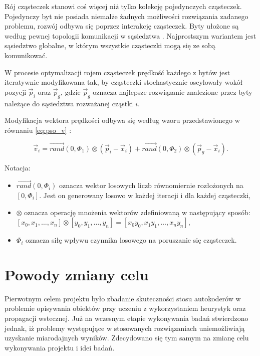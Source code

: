 \documentclass[11pt,a4paper,oneside]{report}
\begin{document}
Rój cząsteczek stanowi coś więcej niż tylko kolekcję pojedynczych cząsteczek. Pojedynczy byt nie posiada niemalże żadnych możliwości rozwiązania zadanego problemu, rozwój odbywa się poprzez interakcję cząsteczek. Byty ułożone są według pewnej topologii komunikacji w sąsiedztwa \cite{kennedy2010particle}. Najprostszym wariantem jest sąsiedztwo globalne, w którym wszystkie cząsteczki mogą się ze sobą komunikować. 

W procesie optymalizacji rojem cząsteczek prędkość każdego z bytów jest iteratywnie modyfikowana tak, by cząsteczki stochastycznie oscylowały wokół pozycji $\vec{p}_{i}$ oraz $\vec{p}_{g}$, gdzie $\vec{p}_{g}$ oznacza najlepsze rozwiązanie znalezione przez byty należące do sąsiedztwa rozważanej cząstki $i$.

Modyfikacja wektora prędkości odbywa się według wzoru przedstawionego w równaniu \eqref{eq:pso_v} \cite{poli2007particle}:

\begin{equation}
\label{eq:pso_v}
\vec{v}_{i} = \vec{rand}(0, \varPhi_{1}) \otimes (\vec{p}_{i} - \vec{x}_{i}) + \vec{rand}(0, \varPhi_{2}) \otimes (\vec{p}_{g} - \vec{x}_{i}).
\end{equation}

Notacja:

\begin{itemize}
\item $\vec{rand}(0, \varPhi_{i})$ oznacza wektor losowych liczb równomiernie rozłożonych na $[0, \varPhi_{i}]$. Jest on generowany losowo w każdej iteracji i dla każdej cząsteczki,
\item $\otimes$ oznacza operację mnożenia wektorów zdefiniowaną w następujący sposób: $[x_0, x_1, \ldots, x_n] \otimes [y_0, y_1, \ldots, y_n] = [x_0 y_0,  x_1 y_1, \ldots, x_n y_n]$,
\item $\varPhi_{i}$ oznacza siłę wpływu czynnika losowego na poruszanie się cząsteczek.
\end{itemize}

\chapter{Powody zmiany celu}

\label{chapter:david-bowie} %




Pierwotnym celem projektu było zbadanie skuteczności stosu autokoderów w problemie opisywania obiektów przy uczeniu z wykorzystaniem heurystyk oraz propagacji wstecznej. Już na wczesnym etapie wykonywania badań stwierdzono jednak, iż problemy występujące w stosowanych rozwiązaniach uniemożliwiają uzyskanie miarodajnych wyników. Zdecydowano się tym samym na zmianę celu wykonywania projektu i idei badań. 
\end{document}

